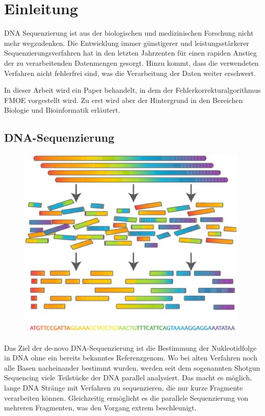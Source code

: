 \chapter{Einleitung}
\label{ch:einleitung}

DNA Sequenzierung ist aus der biologischen und medizinischen Forschung nicht mehr wegzudenken.
Die Entwicklung immer günstigerer und leistungsstärkerer Sequenzierungsverfahren hat in den letzten Jahrzenten für einen rapiden Anstieg der zu verarbeitenden Datenmengen gesorgt.
Hinzu kommt, dass die verwendeten Verfahren nicht fehlerfrei sind, was die Verarbeitung der Daten weiter erschwert.

In dieser Arbeit wird ein Paper behandelt, in dem der Fehlerkorrekturalgorithmus FMOE vorgestellt wird.
Zu erst wird aber der Hintergrund in den Bereichen Biologie und Bioinformatik erläutert.

\section{DNA-Sequenzierung}
\label{s:dna-seq} 

\begin{figure}[h]
\begin{center}
		\includegraphics[width=0.45\columnwidth]{./img/shotgun_sequencing.png}
\end{center}
\caption{}
\label{fig:histogram}
\end{figure}

Das Ziel der de-novo DNA-Sequenzierung ist die Bestimmung der Nukleotidfolge in DNA ohne ein bereits bekanntes Referenzgenom.
Wo bei alten Verfahren noch alle Basen nacheinander bestimmt wurden, werden seit dem sogenannten Shotgun Sequencing viele Teilstücke der DNA parallel analysiert.
Das macht es möglich, lange DNA Stränge mit Verfahren zu sequenzieren, die nur kurze Fragmente verarbeiten können.
Gleichzeitig ermöglicht es die parallele Sequenzierung von mehreren Fragmenten, was den Vorgang extrem beschleunigt.

